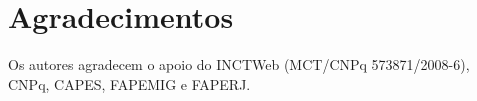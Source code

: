 \documentclass[10pt, a4paper, onecolumn, conference, compsocconf]{IEEEtran}
\begin{document}
\section*{Agradecimentos}

Os autores agradecem o apoio do INCTWeb (MCT/CNPq 573871/2008-6), CNPq, CAPES, FAPEMIG e FAPERJ.




%
%
%





\end{document}
